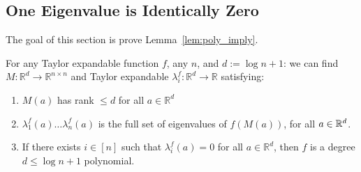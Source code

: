 \subsection{One Eigenvalue is Identically Zero}\label{sec:poly_imply}
The goal of this section is prove Lemma~\ref{lem:poly_imply}.
\begin{lemma} \label{lem:poly_imply}
For any Taylor expandable function $f$, any $n$, and $d:= \log n+1$: we can find $M:\mathbb{R}^d \rightarrow \mathbb{R}^{n \times n}$ and Taylor expandable $\lambda^f_i:\mathbb{R}^d \rightarrow \mathbb{R}$ satisfying:
\begin{enumerate} 
\item $M(a)$ has rank $\leq d$ for all $a \in \mathbb{R}^d$
\item $\lambda^f_1(a) \ldots \lambda^f_n(a)$ is the full set of eigenvalues of $f(M(a))$, for all $a \in {\mathbb R}^d$.
\item If there exists $i \in [n]$ such that $\lambda^f_i(a) = 0$ for all $a \in \mathbb{R}^d$, then $f$ is a degree $d \leq \log n + 1$ polynomial. 
\end{enumerate}
\end{lemma}

